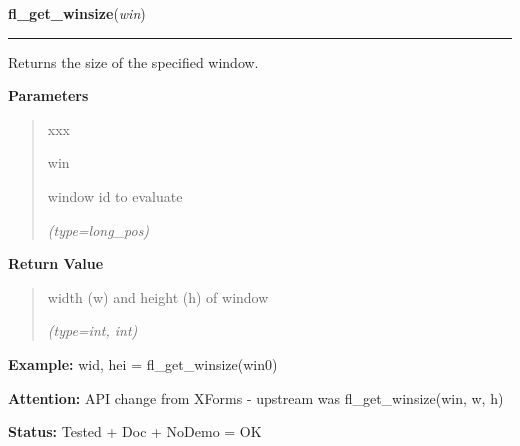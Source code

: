     \vspace{0.5ex}

\hspace{.8\funcindent}\begin{boxedminipage}{\funcwidth}

    \raggedright \textbf{fl\_get\_winsize}(\textit{win})

    \vspace{-1.5ex}

    \rule{\textwidth}{0.5\fboxrule}
\setlength{\parskip}{2ex}
    Returns the size of the specified window.

\setlength{\parskip}{1ex}
      \textbf{Parameters}
      \vspace{-1ex}

      \begin{quote}
        \begin{Ventry}{xxx}

          \item[win]

          window id to evaluate

            {\it (type=long\_pos)}

        \end{Ventry}

      \end{quote}

      \textbf{Return Value}
    \vspace{-1ex}

      \begin{quote}
      width (w) and height (h) of window

      {\it (type=int, int)}

      \end{quote}

\textbf{Example:} wid, hei = fl\_get\_winsize(win0)



\textbf{Attention:} API change from XForms - upstream was fl\_get\_winsize(win, w, h)



\textbf{Status:} Tested + Doc + NoDemo = OK



    \end{boxedminipage}

    \label{xformslib:flxbasic:fl_get_winorigin}

    \vspace{0.5ex}

